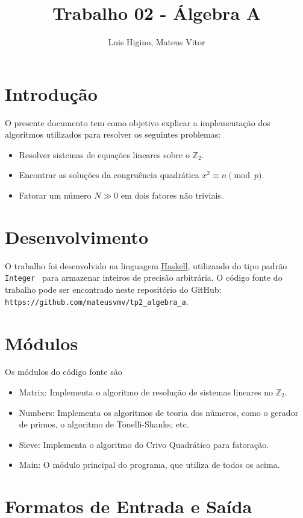 \documentclass{article}
\title{Trabalho 02 - Álgebra A}
\author{Luis Higino, Mateus Vitor}
\begin{document}
\maketitle

\section{Introdução}
\label{intro}
O presente documento tem como objetivo explicar a implementação dos algoritmos utilizados para resolver os seguintes problemas:
\begin{itemize}
    \item Resolver sistemas de equações lineares sobre o $\mathbb{Z}_2$.
    \item Encontrar as soluções da congruência quadrática $x^2 \equiv n \pmod{p}$.
    \item Fatorar um número $N \gg 0$ em dois fatores não triviais.
\end{itemize} 
\section{Desenvolvimento}

O trabalho foi desenvolvido na linguagem \href{https://www.haskell.org/}{Haskell}, utilizando do tipo padrão \verb| Integer | para armazenar inteiros de precisão arbitrária. O código fonte do trabalho pode ser encontrado neste repositório do GitHub:
\\\verb|https://github.com/mateusvmv/tp2_algebra_a|.

\section{Módulos}

Os módulos do código fonte são

\begin{itemize}
\item Matrix: Implementa o algoritmo de resolução de sistemas lineares no $\mathbb{Z}_2$.
\item Numbers: Implementa os algoritmos de teoria dos números, como o gerador de primos, o algoritmo de Tonelli-Shanks, etc.
\item Sieve: Implementa o algoritmo do Crivo Quadrático para fatoração.
\item Main: O módulo principal do programa, que utiliza de todos os acima.
\end{itemize}

\section{Formatos de Entrada e Saída}
\end{document}
